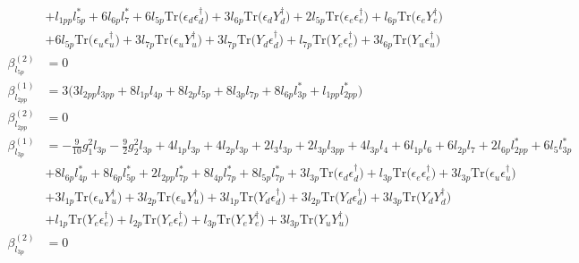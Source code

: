 {\begin{align}
 &+l_{1pp} l_{5p}^* +6 l_{6p} l_7^* +6 l_{5p} \mbox{Tr}\Big({\epsilon_d  \epsilon_{d}^{\dagger}}\Big) +3 l_{6p} \mbox{Tr}\Big({\epsilon_d  Y_{d}^{\dagger}}\Big) +2 l_{5p} \mbox{Tr}\Big({\epsilon_e  \epsilon_{e}^{\dagger}}\Big) +l_{6p} \mbox{Tr}\Big({\epsilon_e  Y_{e}^{\dagger}}\Big) \nonumber \\ 
 &+6 l_{5p} \mbox{Tr}\Big({\epsilon_u  \epsilon_{u}^{\dagger}}\Big) +3 l_{7p} \mbox{Tr}\Big({\epsilon_u  Y_{u}^{\dagger}}\Big) +3 l_{7p} \mbox{Tr}\Big({Y_d  \epsilon_{d}^{\dagger}}\Big) +l_{7p} \mbox{Tr}\Big({Y_e  \epsilon_{e}^{\dagger}}\Big) +3 l_{6p} \mbox{Tr}\Big({Y_u  \epsilon_{u}^{\dagger}}\Big) \\ 
\beta_{l_{5p}}^{(2)} & =  
0\\ 
\beta_{l_{2pp}}^{(1)} & =  
3 \Big(3 l_{2pp} l_{3pp}  + 8 l_{1p} l_{4p}  + 8 l_{2p} l_{5p}  + 8 l_{3p} l_{7p}  + 8 l_{6p} l_{3p}^*  + l_{1pp} l_{2pp}^* \Big)\\ 
\beta_{l_{2pp}}^{(2)} & =  
0\\ 
\beta_{l_{3p}}^{(1)} & =  
-\frac{9}{10} g_{1}^{2} l_{3p} -\frac{9}{2} g_{2}^{2} l_{3p} +4 l_{1p} l_{3p} +4 l_{2p} l_{3p} +2 l_3 l_{3p} +2 l_{3p} l_{3pp} +4 l_{3p} l_4 +6 l_{1p} l_6 +6 l_{2p} l_7 +2 l_{6p} l_{2pp}^* +6 l_5 l_{3p}^* \nonumber \\ 
 &+8 l_{6p} l_{4p}^* +8 l_{6p} l_{5p}^* +2 l_{2pp} l_{7p}^* +8 l_{4p} l_{7p}^* +8 l_{5p} l_{7p}^* +3 l_{3p} \mbox{Tr}\Big({\epsilon_d  \epsilon_{d}^{\dagger}}\Big) +l_{3p} \mbox{Tr}\Big({\epsilon_e  \epsilon_{e}^{\dagger}}\Big) +3 l_{3p} \mbox{Tr}\Big({\epsilon_u  \epsilon_{u}^{\dagger}}\Big) \nonumber \\ 
 &+3 l_{1p} \mbox{Tr}\Big({\epsilon_u  Y_{u}^{\dagger}}\Big) +3 l_{2p} \mbox{Tr}\Big({\epsilon_u  Y_{u}^{\dagger}}\Big) +3 l_{1p} \mbox{Tr}\Big({Y_d  \epsilon_{d}^{\dagger}}\Big) +3 l_{2p} \mbox{Tr}\Big({Y_d  \epsilon_{d}^{\dagger}}\Big) +3 l_{3p} \mbox{Tr}\Big({Y_d  Y_{d}^{\dagger}}\Big) \nonumber \\ 
 &+l_{1p} \mbox{Tr}\Big({Y_e  \epsilon_{e}^{\dagger}}\Big) +l_{2p} \mbox{Tr}\Big({Y_e  \epsilon_{e}^{\dagger}}\Big) +l_{3p} \mbox{Tr}\Big({Y_e  Y_{e}^{\dagger}}\Big) +3 l_{3p} \mbox{Tr}\Big({Y_u  Y_{u}^{\dagger}}\Big) \\ 
\beta_{l_{3p}}^{(2)} & =  
0
\end{align}} 
